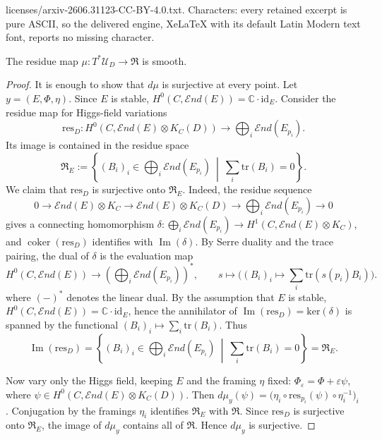 \documentclass[10pt,a4paper]{amsart}
\def\ker{\textrm{ker}}
\def\res{\mathrm{res}}
\newcommand{\C}{\mathbb C}
\newcommand{\End}{\mathcal E nd}
\newcommand{\id}{\mathrm{id}}
\newcommand{\tr}{\mathrm{tr}}
\begin{document}
licenses/arxiv-2606.31123-CC-BY-4.0.txt. Characters: every retained excerpt is pure ASCII, so the delivered engine, XeLaTeX with its default Latin Modern text font, reports no missing character.
\begin{lemma}\label{lem:markman-residue-submersion}
	The residue map $\mu:T^*\mathcal U_D\to\mathfrak R$ is smooth.
\end{lemma}

\begin{proof}
	It is enough to show that $d\mu$ is surjective at every point. Let
	$y=(E,\Phi,\eta)$. Since $E$ is stable, $H^0(C,\End(E))=\C\cdot\id_E$. Consider the residue map for Higgs-field variations
	\[
	\res_D:
	H^0(C,\End(E)\otimes K_C(D))
	\longrightarrow
	\bigoplus_i\End(E_{p_i}).
	\]
	Its image is contained in the  residue space
	\[
	\mathfrak R_E:=
	\left\{
	(B_i)_i\in\bigoplus_i\End(E_{p_i})
	\ \middle|\
	\sum_i\tr(B_i)=0
	\right\}.
	\]
	We claim that $\res_D$ is surjective onto $\mathfrak R_E$. Indeed, the residue sequence
	\[
	0\to\End(E)\otimes K_C
	\to\End(E)\otimes K_C(D)
	\to \bigoplus_i\End(E_{p_i}) \to 0
	\]
	gives a connecting homomorphism $\delta:\bigoplus_i\End(E_{p_i})
	\longrightarrow H^1(C,\End(E)\otimes K_C)$,
	and $\operatorname{coker}(\res_D)$ identifies with $\operatorname{Im}(\delta)$.
	By Serre duality and the trace pairing, the dual of $\delta$ is the evaluation
	map
	\[
	H^0(C,\End(E))
	\longrightarrow
	\left(\bigoplus_i\End(E_{p_i})\right)^*,
	\qquad
	s\longmapsto \bigl((B_i)_i\mapsto \sum_i\tr(s(p_i)B_i)\bigr).
	\]
    where $(-)^*$ denotes the linear dual. By the assumption that $E$ is stable, $H^0(C,\End(E))=\C\cdot\id_E$, hence the annihilator of
	$\operatorname{Im}(\res_D)=\ker(\delta)$ is spanned by the functional $(B_i)_i\longmapsto \sum_i\tr(B_i)$. Thus
	\[
	\operatorname{Im}(\res_D)
	=
	\left\{
	(B_i)_i\in\bigoplus_i\End(E_{p_i})
	\ \middle|\
	\sum_i\tr(B_i)=0
	\right\}
	=\mathfrak R_E.
	\]

	Now vary only the Higgs field, keeping $E$ and the framing $\eta$ fixed:
	$\Phi_\varepsilon=\Phi+\varepsilon\psi$, where
	$\psi\in H^0(C,\End(E)\otimes K_C(D))$. Then $
	d\mu_y(\psi)
	=
	\bigl(\eta_i\circ\res_{p_i}(\psi)\circ\eta_i^{-1}\bigr)_i$. Conjugation by the framings $\eta_i$ identifies $\mathfrak R_E$ with
	$\mathfrak R$. Since $\res_D$ is surjective onto $\mathfrak R_E$, the image of
	$d\mu_y$ contains all of $\mathfrak R$. Hence $d\mu_y$ is surjective.
\end{proof}
\end{document}
